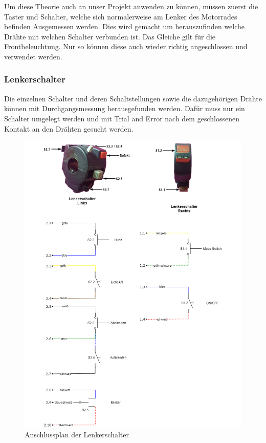 Um diese Theorie auch an unser Projekt anwenden zu können, müssen zuerst die Taster und Schalter, welche sich normalerweise am Lenker des Motorrades befinden Ausgemessen werden. Dies wird gemacht um herauszufinden welche Drähte mit welchen Schalter verbunden ist. Das Gleiche gilt für die Frontbeleuchtung. Nur so können diese auch wieder richtig angeschlossen und verwendet werden.

\subsubsection{Lenkerschalter}

 Die einzelnen Schalter und deren Schaltstellungen sowie die dazugehörigen Drähte können mit Durchgangsmessung herausgefunden werden. Dafür muss nur ein Schalter umgelegt werden und mit Trial and Error nach dem geschlossenen Kontakt an den Drähten gesucht werden.  

\begin{figure}[H]
	\begin{center}
		\includegraphics[scale=0.6]{figures/hcis/Motorrad-switches.png}
		\caption{Anschlussplan der Lenkerschalter}
		\label{fig:switches}
	\end{center}
\end{figure} 

